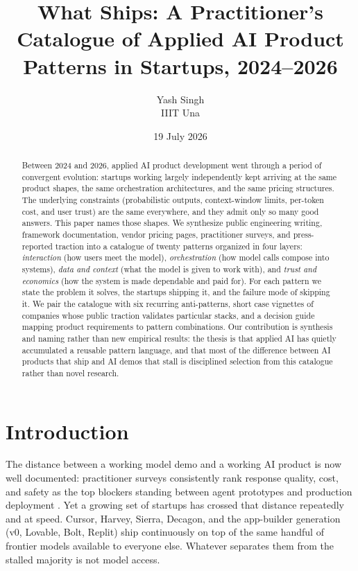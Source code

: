 \documentclass[11pt]{article}
\title{What Ships: A Practitioner's Catalogue of Applied AI Product Patterns in Startups, 2024--2026}
\author{Yash Singh\\
\small IIIT Una}
\date{19 July 2026}
\begin{document}
\maketitle

\begin{abstract}
Between 2024 and 2026, applied AI product development went through a period of
convergent evolution: startups working largely independently kept arriving at
the same product shapes, the same orchestration architectures, and the same
pricing structures. The underlying constraints (probabilistic outputs,
context-window limits, per-token cost, and user trust) are the same
everywhere, and they admit only so many good answers. This paper names those
shapes. We synthesize public engineering writing,
framework documentation, vendor pricing pages, practitioner surveys, and
press-reported traction into a catalogue of twenty patterns organized in four
layers: \emph{interaction} (how users meet the model), \emph{orchestration}
(how model calls compose into systems), \emph{data and context} (what the model
is given to work with), and \emph{trust and economics} (how the system is made
dependable and paid for). For each pattern we state the problem it solves, the
startups shipping it, and the failure mode of skipping it. We pair the
catalogue with six recurring anti-patterns, short case vignettes of companies
whose public traction validates particular stacks, and a decision guide mapping
product requirements to pattern combinations. Our contribution is synthesis and
naming rather than new empirical results: the thesis is that applied AI has
quietly accumulated a reusable pattern language, and that most of the
difference between AI products that ship and AI demos that stall is disciplined
selection from this catalogue rather than novel research.
\end{abstract}

\section{Introduction}

The distance between a working model demo and a working AI product is now well
documented: practitioner surveys consistently rank response quality, cost, and
safety as the top blockers standing between agent prototypes and production
deployment \citep{langchain2024state}. Yet a
growing set of startups has crossed that distance repeatedly and at speed.
Cursor, Harvey, Sierra, Decagon, and the app-builder generation
(v0, Lovable, Bolt, Replit) ship continuously on top of the same handful of
frontier models available to everyone else. Whatever separates them from the stalled
majority is not model access.
\end{document}
